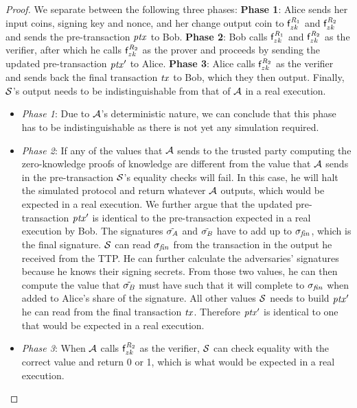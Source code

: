 \begin{proof}
    We separate between the following three phases:
    \textbf{Phase 1}: Alice sends her input coins, signing key and nonce, and her change output coin to $\mathsf{f}^{\mathit{R}_1}_{zk}$ and $\mathsf{f}^{\mathit{R}_2}_{zk}$ and sends the pre-transaction $\mathit{ptx}$ to Bob.
    \textbf{Phase 2}: Bob calls $\mathsf{f}^{\mathit{R}_1}_{zk}$ and $\mathsf{f}^{\mathit{R}_2}_{zk}$ as the verifier, after which he calls $\mathsf{f}^{\mathit{R}_2}_{zk}$ as the prover and proceeds by sending the updated pre-transaction ${\mathit{ptx}}'$ to Alice.
    \textbf{Phase 3}: Alice calls $\mathsf{f}^{\mathit{R}_2}_{zk}$ as the verifier and sends back the final transaction $\mathit{tx}$ to Bob, which they then output.
    Finally, $\mathcal{S}$'s output needs to be indistinguishable from that of $\mathcal{A}$ in a real execution.
    \begin{itemize}
        \item \textit{Phase 1}: Due to $\mathcal{A}$'s deterministic nature, we can conclude that this phase has to be indistinguishable as there is not yet any simulation required.
        \item \textit{Phase 2}: If any of the values that $\mathcal{A}$ sends to the trusted party computing the zero-knowledge proofs of knowledge are different from the value that $\mathcal{A}$ sends in the pre-transaction $\mathcal{S}$'s equality checks will fail.
        In this case, he will halt the simulated protocol and return whatever $\mathcal{A}$ outputs, which would be expected in a real execution.
        We further argue that the updated pre-transaction ${\mathit{ptx}}'$ is identical to the pre-transaction expected in a real execution by Bob.
        The signatures $\tilde{\sigma_{\mathit{A}}}$ and $\tilde{\sigma_{\mathit{B}}}$ have to add up to $\sigma_{\mathit{fin}}$, which is the final signature.
        $\mathcal{S}$ can read $\sigma_{\mathit{fin}}$ from the transaction in the output he received from the TTP.
        He can further calculate the adversaries' signatures because he knows their signing secrets.
        From those two values, he can then compute the value that $\tilde{\sigma_{\mathit{B}}}$ must have such that it will complete to $\sigma_{\mathit{fin}}$ when added to Alice's share of the signature.
        All other values $\mathcal{S}$ needs to build ${\mathit{ptx}}'$ he can read from the final transaction $\mathit{tx}$.
        Therefore ${\mathit{ptx}}'$ is identical to one that would be expected in a real execution.
        \item \textit{Phase 3}: When $\mathcal{A}$ calls $\mathsf{f}^{\mathit{R}_2}_{zk}$ as the verifier, $\mathcal{S}$ can check equality with the correct value and return 0 or 1, which is what would be expected in a real execution.
    \end{itemize}



\end{proof}
